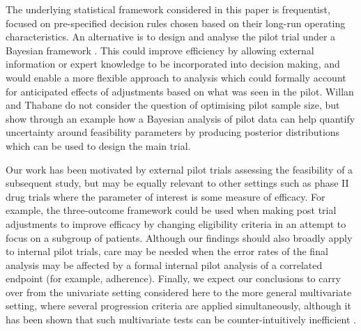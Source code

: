 \documentclass{bmcart}
\begin{document}
The underlying statistical framework considered in this paper is frequentist, focused on pre-specified decision rules chosen based on their long-run operating characteristics. An alternative is to design and analyse the pilot trial under a Bayesian framework \cite{Hampson2017, Wilson2021}. This could improve efficiency by allowing external information or expert knowledge to be incorporated into decision making, and would enable a more flexible approach to analysis which could formally account for anticipated effects of adjustments based on what was seen in the pilot. Willan and Thabane \cite{Willan2020} do not consider the question of optimising pilot sample size, but show through an example how a Bayesian analysis of pilot data can help quantify uncertainty around feasibility parameters by producing posterior distributions which can be used to design the main trial. 


Our work has been motivated by external pilot trials assessing the feasibility of a subsequent study, but may be equally relevant to other settings such as phase II drug trials where the parameter of interest is some measure of efficacy. For example, the three-outcome framework could be used when making post trial adjustments to improve efficacy by changing eligibility criteria in an attempt to focus on a subgroup of patients. Although our findings should also broadly apply to internal pilot trials, care may be needed when the error rates of the final analysis may be affected by a formal internal pilot analysis of a correlated endpoint (for example, adherence). Finally, we expect our conclusions to carry over from the univariate setting considered here to the more general multivariate setting, where several progression criteria are applied simultaneously\cite{Lewis2021a}, although it has been shown that such multivariate tests can be counter-intuitively inefficient \cite{Wilson2021a}.
\end{document}
